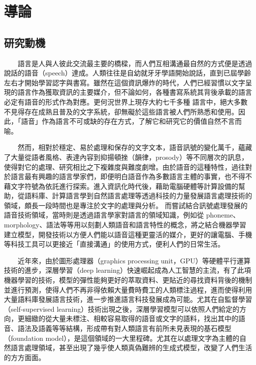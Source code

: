\chapter{導論}
\section{研究動機}

　　語言是人與人彼此交流最主要的橋樑，而人們互相溝通最自然的方式便是透過說話的語音（speech）達成。人類往往是自幼就牙牙學語開始說話，直到已屆學齡左右才開始學習認字與書寫。雖然在這個資訊爆炸的時代，人們已經習慣以文字呈現的語言作為獲取資訊的主要媒介，但不論如何，各種書寫系統其背後承載的語言必定有語音的形式作為對應。更何況世界上現存大約七千多種  \cite{ethnologue}  語言中，絕大多數不見得存在成熟且普及的文字系統，卻無礙於這些語言被人們所熟悉和使用。因此，「語音」作為語言不可或缺的存在方式，了解它和研究它的價值自然不言而喻。

　　然而，相對於穩定、易於處理和保存的文字文本，語音訊號的變化萬千，蘊藏了大量從語者風格、表達內容到抑揚頓挫（韻律，prosody）等不同層次的訊息，使得對它的處理、研究相比之下複雜度與難度劇增。由於語音的這種特性，過往對於語言最有興趣的語言學家們，即便明白語音作為多數語言主體的事實，也不得不藉文字符號為依託進行探索。進入資訊化時代後，藉助電腦硬體等計算設備的幫助，從語料庫、計算語言學到自然語言處理等透過科技的力量發展語言處理技術的領域，頗長一段時間也是專注於文字的處理與分析。
而嘗試結合訊號處理發展的語音技術領域，當時則是透過語言學家對語言的領域知識，例如從 phoneme、morphology、語法等等用以刻劃人類語音和語言特性的概念，將之結合機器學習建立模型，開發技術以方便人們能以語音這種更靈活的媒介，更好的讓電腦、手機等科技工具可以更接近「直接溝通」的使用方式，便利人們的日常生活。

　　近年來，由於圖形處理器（graphics processing unit，GPU）等硬體平行運算技術的進步，深層學習（deep learning）快速崛起成為人工智慧的主流，有了此項機器學習的技術，模型的彈性能夠更好的萃取資料、更貼近的尋找資料背後的機制並進行預測，使得人們不再非得依賴大量費時費工的人類標注過程，進而使得利用大量語料庫發展語言技術，進一步推進語言科技發展成為可能。尤其在自監督學習（self-supervised learning）技術出現之後，深層學習模型可以依照人們給定的方向，更細緻的從大量未標注、相較容易取得的語音或文字的語料，找出其中的語音、語法及語義等等結構，形成帶有對人類語言有前所未見表現的基石模型（foundation model），是這個領域的一大里程碑。尤其在以處理文字為主體的自然語言處理領域，甚至出現了幾乎使人類真偽難辨的生成式模型，改變了人們生活的方方面面。

